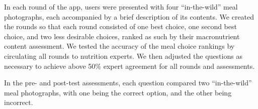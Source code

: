 In each round of the app, users were presented with four ``in-the-wild'' meal photographs, each accompanied by a brief description of its contents. We created the rounds so that each round consisted of one best choice, one second best choice, and two less desirable choices, ranked as such by their macronutrient content assessment. We tested the accuracy of the meal choice rankings by circulating all rounds to nutrition experts. 
We then adjusted the questions as necessary to achieve above 50\% expert agreement for all rounds and assessments. 

In the pre- and post-test assessments, each question compared two ``in-the-wild'' meal photographs, with one being the correct option, and the other being incorrect.
